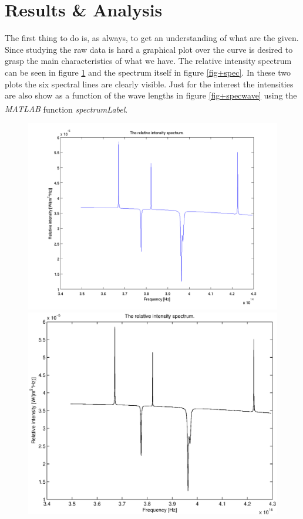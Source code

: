 \documentclass[10pt, a4paper]{article}
\newcommand{\matlab}{\small{\emph{MATLAB\textsuperscript{\textregistered}}}}
\begin{document}
\section{Results \& Analysis}
The first thing to do is, as always, to get an understanding of what are the given. Since studying the raw data is hard a graphical plot over the curve is desired to grasp the main characteristics of what we have. The relative intensity spectrum can be seen in figure \ref{fig+rellspec} and the spectrum itself in figure \ref{fig+spec}. In these two plots the six spectral lines are clearly visible. Just for the interest the intensities are also show as a function of the wave lengths in figure \ref{fig+specwave} using the \matlab{} function \emph{spectrumLabel}\cite{spectrumLabel}.


\begin{figure}[hbt]
\begin{center}
\ifpdf
	\includegraphics[width=\linewidth]{../img/spectrum_relative.png}
\else
	\includegraphics[width=\linewidth]{../img/spectrum_relative.eps}
\fi
\end{center}
\caption{}
\label{fig+rellspec}
\end{figure}
\end{document}
